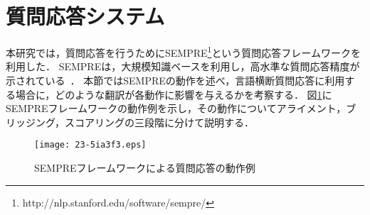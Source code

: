 \documentclass[japanese]{jnlp_1.4}
\begin{document}
\section{質問応答システム}
\label{sec:QAsystem}

本研究では，質問応答を行うためにSEMPRE\footnote{http://nlp.stanford.edu/software/sempre/}という質問応答フレームワークを利用した．
SEMPREは，大規模知識ベースを利用し，高水準な質問応答精度が示されている~\cite{berant2013}．
本節ではSEMPREの動作を述べ，言語横断質問応答に利用する場合に，どのような翻訳が各動作に影響を与えるかを考察する．
図\ref{fig:sempre_framework}にSEMPREフレームワークの動作例を示し，その動作についてアライメント，ブリッジング，スコアリングの三段階に分けて説明する．

\begin{figure}[b]
\begin{center}
\texttt{[image: 23-5ia3f3.eps]}
\end{center}
\caption{SEMPREフレームワークによる質問応答の動作例}
\label{fig:sempre_framework}
\end{figure}
\end{document}
